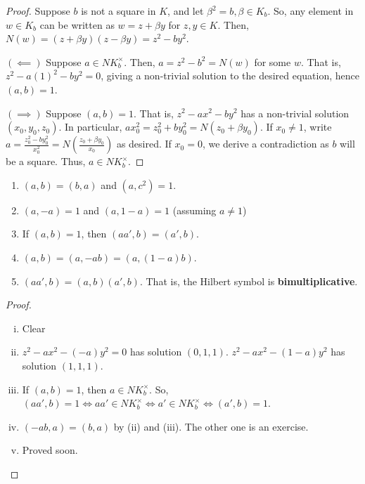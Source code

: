 \begin{proof}
    Suppose $b$ is not a square in $K$, and let $\beta^2=b,\beta \in K_b$. So, any element in $w \in K_b$ can be written as $w=z+\beta y$ for $z,y \in K$. Then, $N(w) =(z+\beta y)(z-\beta y)=z^2-by^2$.

    $(\impliedby)$ Suppose $a \in NK_b^\times$. Then, $a = z^2-b^2=N(w)$ for some $w$. That is, $z^2-a(1)^2-by^2=0$, giving a non-trivial solution to the desired equation, hence $(a,b)=1$.

    $(\implies)$ Suppose $(a,b)=1$. That is, $z^2-ax^2-by^2$ has a non-trivial solution $(x_0,y_0,z_0)$. In particular, $ax_0^2=z_0^2+by_0^2 = N(z_0 + \beta y_0)$. If $x_0 \neq 1$, write $a = \frac{z_0^2-by_0^2}{x_0^2}=N(\frac{z_0+\beta y_0}{x_0})$ as desired. If $x_0 = 0$, we derive a contradiction as $b$ will be a square. Thus, $a \in NK_b^\times$.
\end{proof}

\begin{prop}
    \begin{enumerate}
        \item[(i)] $(a,b)=(b,a)$ and $(a,c^2)=1$.
        \item[(ii)] $(a,-a)=1$ and $(a,1-a) = 1$ (assuming $a \neq 1$)
        \item[(iii)] If $(a,b)=1$, then $(aa',b)=(a',b)$.
        \item[(iv)] $(a,b)=(a,-ab)=(a,(1-a)b)$.
        \item[(v)] $(aa',b)=(a,b)(a',b)$. That is, the Hilbert symbol is \textbf{bimultiplicative}.
    \end{enumerate}
\end{prop}

\begin{proof}
    \hfill

    \begin{enumerate}[(i)]
        \item Clear
        \item $z^2-ax^2-(-a)y^2=0$ has solution $(0,1,1)$. $z^2-ax^2-(1-a)y^2$ has solution $(1,1,1)$.
        \item If $(a,b)=1$, then $a \in NK_b^\times$. So, $(aa',b)=1 \iff aa' \in NK_b^\times \iff a' \in NK_b^\times \iff (a',b)=1$.
        \item $(-ab,a)=(b,a)$ by (ii) and (iii). The other one is an exercise.
        \item Proved soon.
    \end{enumerate}
\end{proof}

